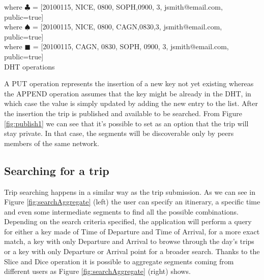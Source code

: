 \begin{table}
where $\clubsuit$ = [20100115, NICE, 0800, SOPH,0900, 3, jsmith@email.com, public=true] \\
where $\spadesuit$ = [20100115, NICE, 0800, CAGN,0830,3, jsmith@email.com, public=true] \\
where $\blacksquare$ = [20100115, CAGN, 0830, SOPH, 0900, 3, jsmith@email.com, public=true] \\
\caption{DHT operations}
  \label{tab:keys}
\end{table}

A PUT operation represents the insertion of a new key not yet existing
whereas the APPEND operation assumes that the key might be already in
the DHT, in which case the value is simply updated by adding the new
entry to the list.
After the insertion the trip is published and available to be
searched. From Figure \ref{fig:publish1} we can see that it's possible
to set as an option that the trip will stay private.  In that case,
the segments will be discoverable only by peers members of the same
network.

\subsection{Searching for a trip}
%
Trip searching happens in a similar way as the trip submission. As we
can see in Figure \ref{fig:searchAggregate} (left) the user can
specify an itinerary, a specific time and even some intermediate
segments to find all the possible combinations. Depending on the
search criteria specified, the application will perform a query for
either a key made of Time of Departure and Time of Arrival, for a more
exact match, a key with only Departure and Arrival to browse through
the day's trips or a key with only Departure or Arrival point for a
broader search.  Thanks to the Slice and Dice operation it is possible
to aggregate segments coming from different users as Figure
\ref{fig:searchAggregate} (right) shows.

